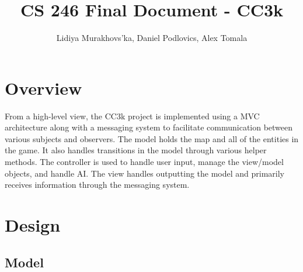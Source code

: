 \documentclass[12pt]{article}
\title{CS 246 Final Document - CC3k}
\author{
Lidiya Murakhovs'ka, Daniel Podlovics, Alex Tomala
}
\date {}
\begin{document}
\maketitle



\section*{Overview}
From a high-level view, the CC3k project is implemented using a MVC architecture along with a messaging system to facilitate communication between various subjects and observers. The model holds the map and all of the entities in the game. It also handles transitions in the model through various helper methods. The controller is used to handle user input, manage the view/model objects, and handle AI. The view handles outputting the model and primarily receives information through the messaging system. 

\section*{Design}

\subsection*{Model}
\end{document}
